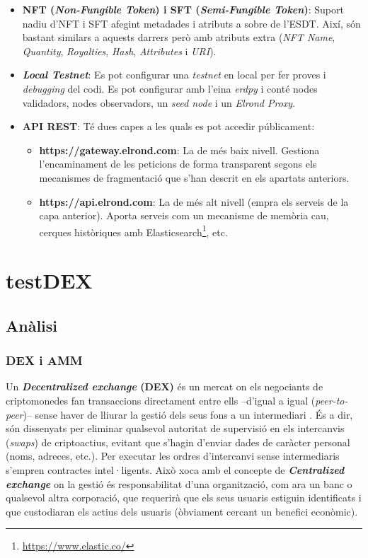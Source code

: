 \documentclass[11pt,a4paper]{article}
\begin{document}
\begin{itemize}
\item \textbf{NFT (\textit{Non-Fungible Token}) i SFT (\textit{Semi-Fungible Token})}: Suport nadiu d'NFT i SFT afegint metadades i atributs a sobre de l'ESDT. Així, són bastant similars a aquests darrers però amb atributs extra (\textit{NFT Name}, \textit{Quantity}, \textit{Royalties}, \textit{Hash}, \textit{Attributes} i \textit{URI}).

\item \textbf{\textit{Local Testnet}}: Es pot configurar una \textit{testnet} en local per fer proves i \textit{debugging} del codi. Es pot configurar amb l'eina \textit{erdpy} i conté nodes validadors, nodes observadors, un \textit{seed node} i un \textit{Elrond Proxy}.

\item  \textbf{API REST}: Té dues capes a les quals es pot accedir públicament:
\begin{itemize}
\item \textbf{https://gateway.elrond.com}: La de més baix nivell. Gestiona l'encaminament de les peticions de forma transparent segons els mecanismes de fragmentació que s'han descrit en els apartats anteriors.
\item \textbf{https://api.elrond.com}:  La de més alt nivell (empra els serveis de la capa anterior). Aporta serveis com un mecanisme de memòria cau, cerques històriques amb Elasticsearch\footnote{\url{https://www.elastic.co/}}, etc.
\end{itemize}
\end{itemize}

\newpage 

\section{testDEX}

\subsection{Anàlisi}
\subsubsection{DEX i AMM}

Un \textbf{\textit{Decentralized exchange} (DEX)} és un mercat on els negociants de criptomonedes fan transaccions directament entre ells –d'igual a igual (\textit{peer-to-peer})– sense haver de lliurar la gestió dels seus fons a un intermediari \cite{cointelegraph}. És a dir, són dissenyats per eliminar qualsevol autoritat de supervisió en els intercanvis (\textit{swaps}) de criptoactius, evitant que s'hagin d'enviar dades de caràcter personal (noms, adreces, etc.). Per executar les ordres d'intercanvi sense intermediaris s'empren contractes intel·ligents. Això xoca amb el concepte de \textit{\textbf{Centralized exchange}} on la gestió és responsabilitat d'una organització, com ara un banc o qualsevol altra corporació, que requerirà que els seus usuaris estiguin identificats i que custodiaran els actius dels usuaris (òbviament cercant un benefici econòmic).
 
\end{document}
